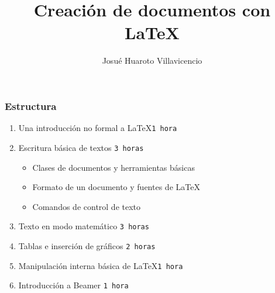 \documentclass{beamer}
\title{Creación de documentos con \LaTeX}
\author[HeNeos]{Josué Huaroto Villavicencio}
\begin{document}
\begin{frame}
\maketitle
\end{frame}
\begin{frame}
\frametitle{Estructura}
\begin{enumerate}
\item Una introducción no formal a \LaTeX \hfill \texttt{1 hora}
\item Escritura básica de textos \hfill \texttt{3 horas}
\begin{itemize}
\item Clases de documentos y herramientas básicas
\item Formato de un documento y fuentes de \LaTeX
\item Comandos de control de texto
\end{itemize}
\item Texto en modo matemático \hfill \texttt{3 horas}
\item Tablas e inserción de gráficos \hfill \texttt{2 horas}
\item Manipulación interna básica de \LaTeX \hfill \texttt{1 hora}
\item Introducción a Beamer \hfill \texttt{1 hora}
\end{enumerate}
\end{frame}
\end{document}
